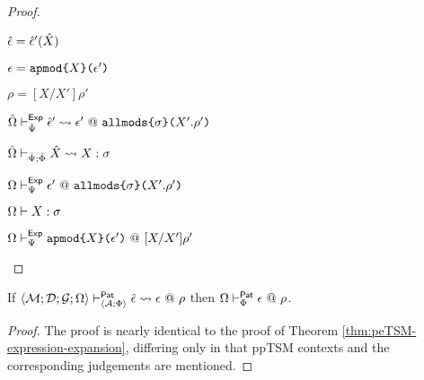 \begin{proof}
\begin{byCases}
    \begin{pfsteps*}
      \item ${\hat\epsilon}={\hat\epsilon}'({\hat X})$ 
      \item $\epsilon=\texttt{apmod}\texttt{\{}X\texttt{\}(}\epsilon'\texttt{)}$ 
      \item $\rho=[X/X']\rho'$ 
      \item ${\hat\Omega} \vdash_{\hat{\Psi}}^{\mathsf{Exp}} {\hat\epsilon}' \leadsto \epsilon'~@~\texttt{allmods}\texttt{\{}\sigma\texttt{\}(}X'.\rho'\texttt{)}$  
      \item ${\hat\Omega} \vdash_{\hat{\Psi}; \hat\Phi} {\hat X} \leadsto X : \sigma$  
      \item $\Omega \vdash_{\Psi}^{\mathsf{Exp}} \epsilon' ~@~ \texttt{allmods}\texttt{\{}\sigma\texttt{\}(}X'.\rho'\texttt{)}$  
      \item $\Omega \vdash X : \sigma$  
      \item $\Omega \vdash_{\Psi}^{\mathsf{Exp}} \texttt{apmod}\texttt{\{}X\texttt{\}(}\epsilon'\texttt{)} ~@~ [X/X']\rho'$ 
    \end{pfsteps*}
    \resetpfcounter
\end{byCases}

\end{proof}

\begin{theorem}
\label{thm:ppTSM-expression-expansion}
If $\langle \mathcal{M}; \mathcal{D}; \mathcal{G}; \Omega \rangle \vdash_{\langle \mathcal{A}; \Phi \rangle}^{\mathsf{Pat}} {\hat\epsilon} \leadsto \epsilon~@~\rho$ then $\Omega \vdash_{\Phi}^{\mathsf{Pat}} \epsilon ~@~ \rho$.
\end{theorem}
\begin{proof} The proof is nearly identical to the proof of Theorem \ref{thm:peTSM-expression-expansion}, differing only in that ppTSM contexts and the corresponding judgements are mentioned. \end{proof}

